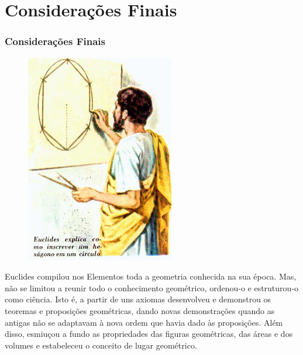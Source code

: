 \section{Considerações Finais}
\begin{frame}
    \frametitle{Considerações Finais}
    \justifying

    \begin{figure}[!h]
        \centering
        \includegraphics[scale=0.35]{img/euclid2.jpg}
    \end{figure}

    \hspace{5mm}Euclides compilou nos Elementos toda a geometria conhecida na sua época. Mas, não se limitou a reunir todo o conhecimento geométrico, ordenou-o e estruturou-o como ciência. Isto é, a partir de uns axiomas desenvolveu e demonstrou os teoremas e proposições geométricas, dando novas demonstrações quando as antigas não se adaptavam à nova ordem que havia dado às proposições. Além disso, esmiuçou a fundo as propriedades das figuras geométricas, das áreas e dos volumes e estabeleceu o conceito de lugar geométrico.
\end{frame}
